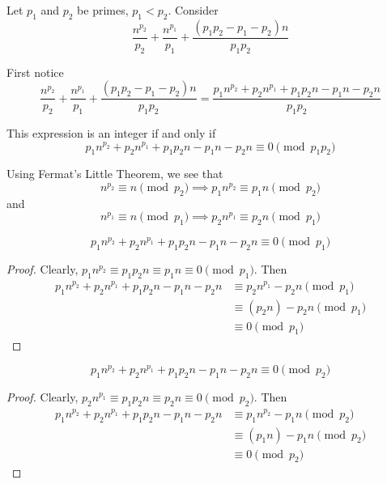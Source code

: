
Let $p_1$ and $p_2$ be primes, $p_1 < p_2$. Consider
\[ \frac{n^{p_2}}{p_2} + \frac{n^{p_1}}{p_1} + \frac{(p_1 p_2 - p_1 - p_2)n}{p_1 p_2} \]

    First notice
    \[ \frac{n^{p_2}}{p_2} + \frac{n^{p_1}}{p_1} + \frac{(p_1 p_2 - p_1 -
    p_2)n}{p_1 p_2} 
    = 
    \frac
    {p_1 n^{p_2} + p_2 n^{p_1} + p_1 p_2 n - p_1 n - p_2 n}
    {p_1 p_2}
    \]
    
    This expression is an integer if and only if 
    \[p_1 n^{p_2} + p_2 n^{p_1} + p_1 p_2 n - p_1 n - p_2 n \equiv 0 \pmod{p_1 p_2} \]
    
    Using Fermat's Little Theorem, we see that
    \[ n^{p_2} \equiv n \pmod{p_2} \implies  p_1 n^{p_2} \equiv p_1 n  \pmod{p_2} \]
    and 
    \[ n^{p_1} \equiv n \pmod{p_1} \implies  p_2 n^{p_1} \equiv p_2 n \pmod{p_1} \]

\begin{claim}
    \[p_1 n^{p_2} + p_2 n^{p_1} + p_1 p_2 n - p_1 n - p_2 n \equiv 0 \pmod{p_1} \]
\end{claim}
\begin{proof}
    Clearly, $p_1 n^{p_2} \equiv p_1 p_2 n \equiv p_1 n \equiv0 \pmod{p_1}$.
    Then
    \begin{align*}
    p_1 n^{p_2} + p_2 n^{p_1} + p_1 p_2 n - p_1 n - p_2 n
    &\equiv p_2 n^{p_1} - p_2 n \pmod{p_1}\\
    &\equiv (p_2 n) - p_2 n \pmod{p_1}\\
    &\equiv 0 \pmod{p_1}
    \end{align*}
\end{proof}

\begin{claim}
    \[p_1 n^{p_2} + p_2 n^{p_1} + p_1 p_2 n - p_1 n - p_2 n \equiv 0 \pmod{p_2} \]
\end{claim}
\begin{proof}
    Clearly, $p_2 n^{p_1} \equiv p_1 p_2 n \equiv p_2 n \equiv0 \pmod{p_2}$.
    Then
    \begin{align*}
    p_1 n^{p_2} + p_2 n^{p_1} + p_1 p_2 n - p_1 n - p_2 n
    &\equiv p_1 n^{p_2} - p_1 n \pmod{p_2}\\
    &\equiv (p_1 n) - p_1 n \pmod{p_2}\\
    &\equiv 0 \pmod{p_2}
    \end{align*}
\end{proof}
\
